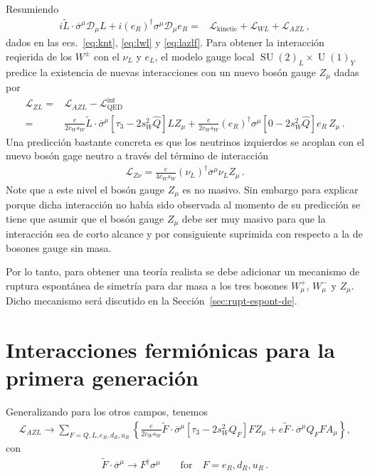 \begin{frame}
Resumiendo
\begin{align}
    i \widetilde{L}\cdot\overline{\sigma}^\mu\mathcal{D}_\mu L+  i \left( e_R \right)^{\dagger}{\sigma}^\mu\mathcal{D}_\mu e_R=&\mathcal{L}_{\text{kinetic}}+
\mathcal{L}_{WL}+ \mathcal{L}_{A Z L}\,,
\end{align}
dados en las ecs.~\eqref{eq:knt}, \eqref{eq:lwl} y \eqref{eq:lazlf}. Para obtener la interacción reqierida de los $W^{\pm}$ con el $\nu_L$ y $e_L$, el modelo gauge local $\operatorname{SU}(2)_L\times \operatorname{U}(1)_Y$ predice la existencia de nuevas interacciones con un nuevo bosón gauge $Z_{\mu}$ dadas por
\begin{align}
\mathcal{L}_{ZL}=&\mathcal{L}_{AZL}-\mathcal{L}^{\text{int}}_{\text{QED}} \nonumber\\
=&\frac{e}{2c_W s_W} \widetilde{L}\cdot\overline{\sigma}^\mu\left[ \tau_3-2s_W^2\widehat{Q}\right]L Z_\mu
+\frac{e}{2c_W s_W} \left( e_R \right)^{\dagger}{\sigma}^\mu\left[ 0-2s_W^2\widehat{Q}\right]e_R\, Z_\mu\,.
\end{align}
Una predicción bastante concreta es que los neutrinos izquierdos se acoplan con el nuevo bosón gage neutro a través del término de interacción
\begin{align}
\mathcal{L}_{Z\nu}=  \frac{e}{4c_W s_W}\left( \nu_L \right)^{\dagger} \overline{\sigma}^{\mu} \nu_L Z_\mu\,.
\end{align}
Note que a este nivel el bosón gauge $Z_{\mu}$ es no masivo. Sin embargo para explicar porque dicha interacción no había sido observada al momento de su predicción se tiene que asumir que el bosón gauge $Z_{\mu}$ debe ser muy masivo para que la interacción sea de corto alcance y por consiguiente suprimida con respecto a la de bosones gauge sin masa. 

Por lo tanto, para obtener una teoría realista se debe adicionar un mecanismo de ruptura espontánea de simetría para dar masa a los tres bosones $W_{\mu}^{+}$, $W_{\mu}^{-}$ y $Z_{\mu}$. Dicho mecanismo será discutido en la Sección~\ref{sec:rupt-espont-de}.



\section{Interacciones fermiónicas para la primera generación}


Generalizando para los otros campos, tenemos
\begin{align}
  \label{eq:azl}
      \mathcal{L}_{A Z L}\to\sum_{F=Q,L,e_R,d_R,u_R}
\left\{  \frac{e}{2c_W s_W}\widetilde{F}\cdot\overline{\sigma}^{\mu}\left[ \tau_3-2s_W^2 Q_F\right]F Z_\mu
       +e\widetilde{F}\cdot\overline{\sigma}^\mu Q_F F A_\mu\right\},
\end{align}
con
\begin{align}
  \widetilde{F}\cdot\overline{\sigma}^{\mu} \to F^{\dagger}\sigma^{\mu} \qquad \text{for}\quad F=e_R,d_R,u_R\,.
\end{align}





\end{frame}
